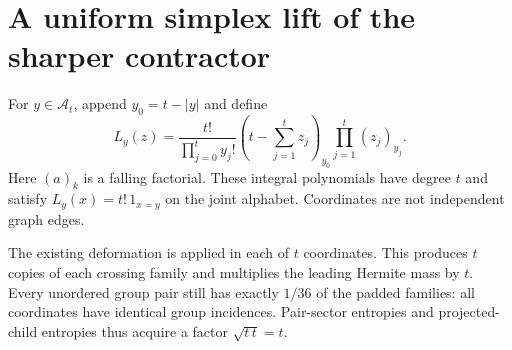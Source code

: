 \documentclass[11pt]{article}
\begin{document}
\section{A uniform simplex lift of the sharper contractor}
For $y\in\mathcal A_t$, append $y_0=t-|y|$ and define
\[
 L_y(z)=\frac{t!}{\prod_{j=0}^t y_j!}
 (t-\textstyle\sum_{j=1}^tz_j)_{y_0}
 \prod_{j=1}^t(z_j)_{y_j}.
\]
Here $(a)_k$ is a falling factorial. These integral polynomials
have degree $t$ and satisfy $L_y(x)=t!\,1_{x=y}$ on the joint
alphabet. Coordinates are not independent graph edges.

The existing deformation is applied in each of $t$ coordinates.
This produces $t$ copies of each crossing family and multiplies
the leading Hermite mass by $t$. Every unordered group pair still
has exactly $1/36$ of the padded families: all coordinates have
identical group incidences. Pair-sector entropies and projected-child
entropies thus acquire a factor $\sqrt{t\,t}=t$.
\end{document}
